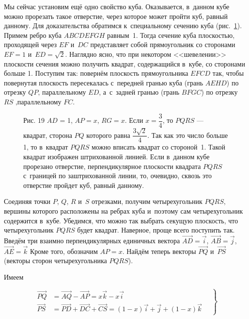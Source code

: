 Мы сейчас установим ещё одно свойство куба. Оказывается, в~данном кубе можно
прорезать такое отверстие, через которое может пройти куб, равный данному.
Для доказательства обратимся к~специальному сечению куба (рис.\ \ref{fig:8_2_19}).
Примем ребро куба $ABCDEFGH$  равным~1. Тогда сечение куба плоскостью,
проходящей через $EF$ и~$DC$ представляет собой прямоугольник со сторонами
$EF = 1$ и~$ED = \sqrt{2}$. Наглядно ясно, что при некотором <<шевелении>>
плоскости сечения можно получить квадрат, содержащийся в~кубе, со сторонами
больше 1. Поступим так: повернём плоскость прямоугольника  $EFCD$ так, чтобы
повернутая плоскость пересекалась с~передней гранью куба (грань $AEHD$)
по отрезку $QP$‚ параллельному $ED$, а~с~задней гранью (грань $BFGC$)
по отрезку $RS$ ‚параллельному $FC$.


\begin{figure}\label{fig:8_2_19}
\caption{Рис. 19
$AD$ = 1, $AP = x$, $RG = x$. Если $x = \dfrac{3}{4}$, то $PQRS$ --- квадрат,
сторона $PQ$ которого равна $\dfrac{3\sqrt{2}}{4}$.
Так как это число больше 1, то в~квадрат $PQRS$ можно вписать квадрат со
стороной~1. Такой квадрат изображен штрихованной линией. Если в~данном кубе
прорезано отверстие, перпендикулярное плоскости квадрата $PQRS$ с~границей по
заштрихованной линии, то, очевидно, сквозь это отверстие пройдет куб,
равный данному.}
\end{figure}

Соединяя точки $P$, $Q$, $R$ и~$S$ отрезками, получим четырехугольник $PQRS$,
вершины которого расположены на ребрах куба и~поэтому сам четырехугольник
содержится в~кубе.
Убедимся, что можно так выбрать секущую плоскость, что четырехугольник
$PQRS$ будет квадрат. Наверное, проще всего поступить так. Введём три взаимно
перпендикулярных единичных вектора
$\overrightarrow{AD} = \vec{i}$,
$\overrightarrow{AB} = \vec{j}$,
$\overrightarrow{AE} = \vec{k}$
Кроме того, обозначим $AP = x$. Найдём теперь векторы $\overrightarrow{PQ}$
и~$\overrightarrow{PS}$ (векторы сторон четырехугольника $PQRS$).


Имеем

\begin{equation}
\left .
\begin{aligned}\label{eq:8_2_1}
\overrightarrow{PQ} &=
\overrightarrow{AQ} - \overrightarrow{AP} = x\vec{k} - x\vec{i} \\
\overrightarrow{PS} &=
\overrightarrow{PD} +
\overrightarrow{DC} +
\overrightarrow{CS} = (1 - x)\vec{i} + \vec{j} + (1 - x)\vec{k}
\end{aligned}
\quad \right\}
\end{equation}

